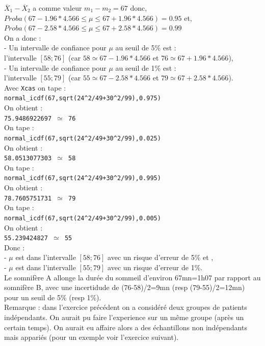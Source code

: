 \documentclass[a4paper,11pt]{book}
\begin{document}
\begin{itemize}
$\overline X_1-\overline X_2$ a comme valeur $m_1-m_2=67$ donc,\\
$Proba(67-1.96*4.566 \leq \mu \leq 67+1.96*4.566)=0.95$ et,\\
$Proba(67-2.58*4.566 \leq \mu \leq 67+2.58*4.566)=0.99$\\
On a donc :\\
- Un intervalle de confiance pour $\mu$ au seuil de 5\% est :\\
l'intervalle $[58;76]$ (car $58 \simeq  67-1.96*4.566$ et $76 \simeq  67+1.96*4.566$),\\
-  Un intervalle de confiance pour $\mu$ au seuil de 1\% est :\\
l'intervalle $[55;79]$ (car $55 \simeq  67-2.58*4.566$ et
$79 \simeq 67+2.58*4.566$).\\
Avec {\tt Xcas} on tape :\\
{\tt normal\_icdf(67,sqrt(24\verb|^|2/49+30\verb|^|2/99),0.975)}\\
On obtient :\\
 {\tt 75.9486922697 $\simeq$ 76 }\\
On tape :\\
{\tt normal\_icdf(67,sqrt(24\verb|^|2/49+30\verb|^|2/99),0.025)}\\
On obtient : \\
{\tt 58.0513077303 $\simeq$  58}\\
On tape :\\
{\tt normal\_icdf(67,sqrt(24\verb|^|2/49+30\verb|^|2/99),0.995)}\\
On obtient : \\
{\tt 78.7605751731 $\simeq$  79}\\
On tape :\\
{\tt normal\_icdf(67,sqrt(24\verb|^|2/49+30\verb|^|2/99),0.005)}\\
On obtient : \\
{\tt 55.239424827 $\simeq$  55}\\
Donc :\\
- $\mu$ est dans l'intervalle $[58;76]$ avec un risque d'erreur de 5\%  et ,\\
-  $\mu$ est dans l'intervalle $[55;79]$ avec un risque d'erreur de 1\%.\\ 
 Le somnif\`ere A allonge la dur\'ee du sommeil d'environ 67mn=1h07 par rapport
 au somnif\`ere B, avec une incertidude de (76-58)/2=9mn (resp (79-55)/2=12mn) 
pour un seuil de 5\% (resp 1\%).\\
Remarque : dans l'exercice pr\'ec\'edent on a consid\'er\'e deux groupes de 
patients ind\'ependants. On aurait pu faire l'experience sur un m\^eme groupe
(apr\`es un certain temps). On aurait eu affaire alors a des \'echantillons non
 ind\'ependants mais appari\'es (pour un exemple voir l'exercice suivant).


\end{itemize}
\end{document}
